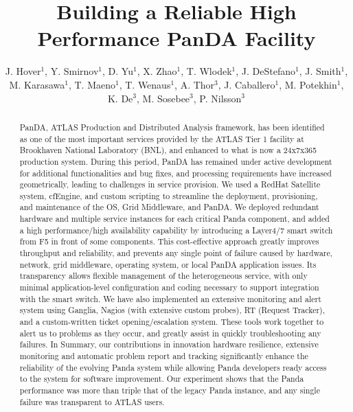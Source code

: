 \documentclass[letterpaper]{jpconf}
\begin{document}
\title{Building a Reliable High Performance PanDA Facility}

\author{J. Hover$^1$, Y. Smirnov$^1$, D. Yu$^1$, X. Zhao$^1$, T. Wlodek$^1$, J.
DeStefano$^1$, J. Smith$^1$, M. Karasawa$^1$, T. Maeno$^1$, T. Wenaus$^1$, A.
Thor$^3$, J. Caballero$^1$, M. Potekhin$^1$, K. De$^3$, M. Sosebee$^3$, P.
Nilsson$^3$}

\address{$^1$ Brookhaven National Laboratory, PO BOX 5000 Upton, NY 11973,
USA}
\address{$^2$ CERN, CH-1211 Geneva 23, Switzerland}
\address{$^3$ University of Texas, 701 S. Nedderman Drive Arlington, TX 76019,
USA}


\begin{abstract}
PanDA, ATLAS Production and Distributed Analysis framework, has been identified 
as one of the most important services provided by the ATLAS Tier 1 facility at Brookhaven 
National Laboratory (BNL), and enhanced to what is now a 24x7x365 production system. During 
this period, PanDA has remained under active development for additional functionalities and 
bug fixes, and processing requirements have increased geometrically, leading to challenges 
in service provision. We used a RedHat Satellite system, cfEngine, and custom scripting to 
streamline the deployment, provisioning, and maintenance of the OS, Grid Middleware, and 
PanDA. We deployed redundant hardware and multiple service instances for each critical Panda 
component, and added a high performance/high availability capability by introducing a 
Layer4/7 smart switch from F5 in front of some components. This cost-effective approach 
greatly improves throughput and reliability, and prevents any single point of failure 
caused by hardware, network, grid middleware, operating system, or local PanDA application 
issues.  Its transparency allows flexible management of the heterogeneous service, with 
only minimal application-level configuration and coding necessary to support integration 
with the smart switch. We have also implemented an extensive monitoring and alert system 
using Ganglia, Nagios (with extensive custom probes), RT (Request Tracker), and a 
custom-written ticket opening/escalation system. These tools work together to alert us to 
problems as they occur, and greatly assist in quickly troubleshooting any failures. In 
Summary, our contributions in innovation hardware resilience, extensive monitoring and 
automatic problem report and tracking significantly enhance the reliability of the 
evolving Panda system while allowing Panda developers ready access to the system for 
software improvement. Our experiment shows that the Panda performance was more than 
triple that of the legacy Panda instance, and any single failure was transparent to ATLAS 
users.
\end{abstract}
\end{document}
